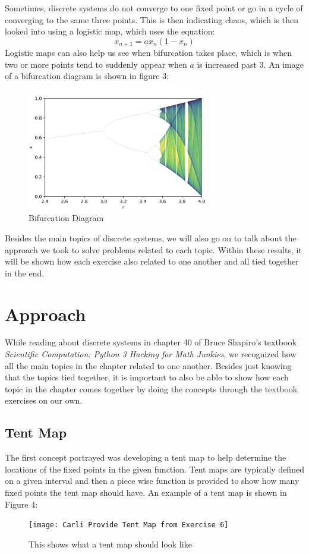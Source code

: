 \documentclass{article}
\begin{document}
Sometimes, discrete systems do not converge to one fixed point or go in a cycle of converging to the same three points. This is then indicating chaos, which is then looked into using a logistic map, which uses the equation:
$$
x_{n+1}=ax_n(1-x_n)
$$
Logistic maps can also help us see when bifurcation takes place, which is when two or more points tend to suddenly appear when $a$ is increased past 3. An image of a bifurcation diagram is shown in figure 3:
\begin{figure}[htp]
    \centering
    \includegraphics[width=8cm]{bifurcation.png}
    \caption{Bifurcation Diagram}
    \label{fig:Bifurcation Diagram}
\end{figure}

Besides the main topics of discrete systems, we will also go on to talk about the approach we took to solve problems related to each topic. Within these results, it will be shown how each exercise also related to one another and all tied together in the end. 

\section{Approach}
While reading about discrete systems in chapter 40 of Bruce Shapiro's textbook \emph{Scientific Computation: Python 3 Hacking for Math Junkies}, we recognized how all the main topics in the chapter related to one another. Besides just knowing that the topics tied together, it is important to also be able to show how each topic in the chapter comes together by doing the concepts through the textbook exercises on our own.

\subsection{Tent Map}
The first concept portrayed was developing a tent map to help determine the locations of the fixed points in the given function. Tent maps are typically defined on a given interval and then a piece wise function is provided to show how many fixed points the tent map should have. An example of a tent map is shown in Figure 4:
\begin{figure}[htp]
    \centering
    \texttt{[image: Carli Provide Tent Map from Exercise 6]}
    \caption{This shows what a tent map should look like}
    \label{fig:Tent Map}
\end{figure}
\end{document}
